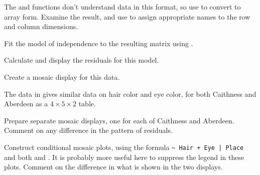 \documentclass[11pt]{report}\usepackage[]{graphicx}\usepackage[]{color}
\begin{document}
\begin{Exercises}
  \begin{enumerate*}
    \item The  and  functions don't understand data in this format, 
    so use  
    to convert to array form.  Examine the result, and use \newline{} to %
    assign appropriate names to the row and column dimensions.
    \item Fit the model of independence to the resulting matrix using .
    \item Calculate and display the residuals for this model.
    \item Create a mosaic display for this data.
  \end{enumerate*}
  

  \exercise The  data in  gives similar data on hair color and eye color, for both
  Caithness and Aberdeen as a $4 \times 5 \times 2$ table.
  \begin{enumerate*}
    \item Prepare separate mosaic displays, one for each of Caithness and Aberdeen.  Comment on any difference in
    the pattern of residuals.
    \item Construct conditional mosaic plots, using the formula
      \verb/~ Hair + Eye | Place/ and both  and
    . It is probably more useful here to suppress the legend in these plots.  Comment on the
    difference in what is shown in the two displays.
  \end{enumerate*}
  


\end{Exercises}
\end{document}
